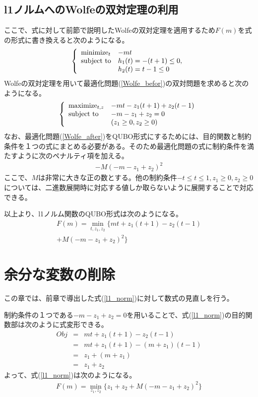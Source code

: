 \documentclass[paper]{ieicej}
\begin{document}
\subsection{l1ノルムへのWolfeの双対定理の利用}
ここで、式に対して前節で説明したWolfeの双対定理を適用するため$F(m)$を式の形式に書き換えると次のようになる。
\begin{equation}
  \left \{
  \begin{array}{ll}
    $minimize$_{t} & -mt \\
    $subject to$ & h_{1}(t)=-(t+1)\leq 0, \\
    & h_{2}(t)=t-1\leq 0 \label{Wolfe_befor}
  \end{array}
  \right.
\end{equation}
Wolfeの双対定理を用いて最適化問題(\ref{Wolfe_befor})の双対問題を求めると次のようになる。
\begin{equation}
  \left \{
  \begin{array}{ll}
    $maximize$_{t,z} & -mt-z_{1}(t+1)+z_{2}(t-1) \\
    $subject to$ & -m-z_{1}+z_{2}=0 \\
    & (z_{1}\geq 0,z_{2}\geq 0) \label{Wolfe_after}
  \end{array}
  \right.
\end{equation}
なお、最適化問題(\ref{Wolfe_after})をQUBO形式にするためには、目的関数と制約条件を１つの式にまとめる必要がある。そのため最適化問題の式に制約条件を満たすように次のペナルティ項を加える。
\begin{eqnarray}
  -M(-m-z_{1}+z_{2})^{2}
\end{eqnarray}
ここで、$M$は非常に大きな正の数とする。他の制約条件$-t\leq t\leq 1,z_{1}\geq 0,z_{2}\geq 0$については、二進数展開時に対応する値しか取らないように展開することで対応できる。

以上より、l1ノルム関数のQUBO形式は次のようになる。
\begin{eqnarray}
    F(m) = \min_{t,z_{1},z_{2}}{\{mt+z_{1}(t+1)-z_{2}(t-1)} \nonumber \\
    +M(-m-z_{1}+z_{2})^{2}\} \label{l1_norm}
\end{eqnarray}

\section{余分な変数の削除}
この章では、前章で導出した式(\ref{l1_norm})に対して数式の見直しを行う。

制約条件の１つである$-m-z_{1}+z_{2}=0$を用いることで、式(\ref{l1_norm})の目的関数部は次のように式変形できる。
\begin{eqnarray}
  Obj &=& mt+z_{1}(t+1)-z_{2}(t-1) \nonumber \\
  &=& mt+z_{1}(t+1)-(m+z_{1})(t-1) \nonumber \\
  &=& z_{1}+(m+z_{1}) \nonumber \\
  &=& z_{1}+z_{2}
\end{eqnarray}
よって、式(\ref{l1_norm})は次のようになる。
\begin{eqnarray}
  F(m) = \min_{z_{1},z_{2}}{\{z_{1}+z_{2}+M(-m-z_{1}+z_{2})^{2}\}} \nonumber \\
  \label{l1}
\end{eqnarray}
\end{document}
